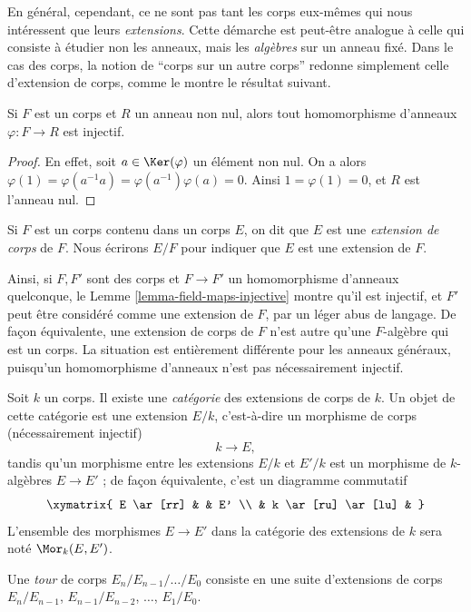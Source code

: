 \noindent
En général, cependant, ce ne sont pas tant les corps eux-mêmes qui nous intéressent que leurs
{\it extensions}. Cette démarche est peut-être analogue à celle qui consiste à étudier non les anneaux,
mais les {\it algèbres} sur un anneau fixé.
Dans le cas des corps, la notion de ``corps sur un autre corps''
redonne simplement celle d'extension de corps, comme le montre le résultat suivant.

\begin{lemma}
\label{lemma-field-maps-injective}
Si $F$ est un corps et $R$ un anneau non nul, alors tout homomorphisme d'anneaux
$\varphi : F \to R$ est injectif.
\end{lemma}

\begin{proof}
En effet, soit $a \in \Ker(\varphi)$ un élément non nul. On a alors
$\varphi(1) = \varphi(a^{-1} a) = \varphi(a^{-1}) \varphi(a) = 0$.
Ainsi $1 = \varphi(1) = 0$, et $R$ est l'anneau nul.
\end{proof}

\begin{definition}
\label{definition-extension}
Si $F$ est un corps contenu dans un corps $E$, on dit que $E$ est
une {\it extension de corps} de $F$. Nous écrirons $E/F$ pour indiquer
que $E$ est une extension de $F$.
\end{definition}

\noindent
Ainsi, si $F, F'$ sont des corps et $F \to F'$ un homomorphisme d'anneaux quelconque, le
Lemme \ref{lemma-field-maps-injective} montre qu'il est injectif, et $F'$ peut être
considéré comme une extension de $F$, par un léger abus de langage. De façon équivalente,
une extension de corps de $F$ n'est autre qu'une $F$-algèbre qui est un corps.
La situation est entièrement différente pour les anneaux généraux, puisqu'un
homomorphisme d'anneaux n'est pas nécessairement injectif.

\medskip\noindent
Soit $k$ un corps. Il existe une {\it catégorie} des extensions de corps de $k$.
Un objet de cette catégorie est une extension $E/k$, c'est-à-dire un
morphisme de corps (nécessairement injectif)
$$
k \to E,
$$
tandis qu'un morphisme entre les extensions $E/k$ et $E'/k$ est un morphisme de
$k$-algèbres $E \to E'$ ; de façon équivalente, c'est un diagramme commutatif
$$
\xymatrix{
E \ar[rr] & & E' \\
& k \ar[ru] \ar[lu] &
}
$$
L'ensemble des morphismes $E \to E'$ dans la catégorie des extensions de $k$
sera noté $\Mor_k(E, E')$.

\begin{definition}
\label{definition-tower}
Une {\it tour} de corps $E_n/E_{n - 1}/\ldots/E_0$ consiste en une suite
d'extensions de corps
$E_n/E_{n - 1}$, $E_{n - 1}/E_{n - 2}$, $\ldots$, $E_1/E_0$.
\end{definition}

